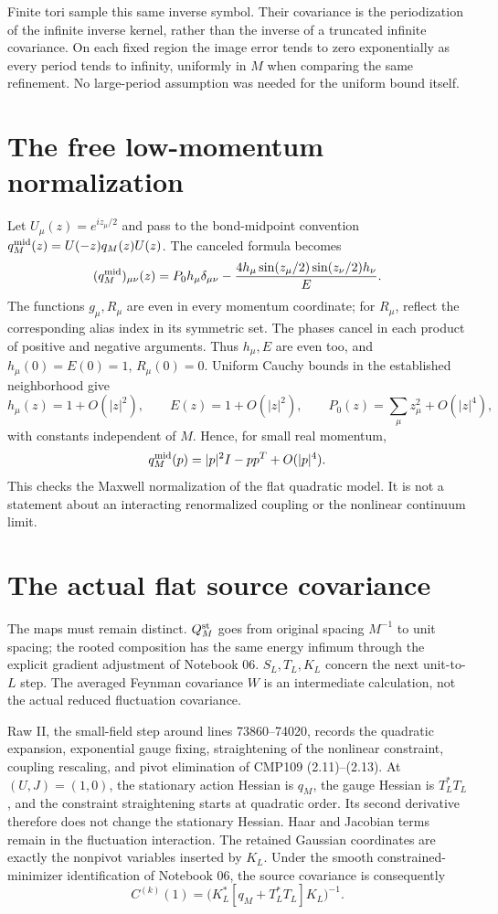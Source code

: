 \documentclass[11pt]{article}
\theoremstyle{remark}
\begin{document}
Finite tori sample this same inverse symbol. Their covariance is the
periodization of the infinite inverse kernel, rather than the inverse
of a truncated infinite covariance. On each fixed region the image
error tends to zero exponentially as every period tends to infinity,
uniformly in $M$ when comparing the same refinement. No large-period
assumption was needed for the uniform bound itself.

\section{The free low-momentum normalization}

Let $U_\mu(z)=e^{iz_\mu/2}$ and pass to the bond-midpoint convention
$q_M^{\rm mid}(z)=U(-z)q_M(z)U(z)$. The canceled formula becomes
\[
 (q_M^{\rm mid})_{\mu\nu}(z)
 =P_0h_\mu\delta_{\mu\nu}
  -\frac{4h_\mu\sin(z_\mu/2)\sin(z_\nu/2)h_\nu}{E}.
\]
The functions $g_\mu,R_\mu$ are even in every momentum coordinate;
for $R_\mu$, reflect the corresponding alias index in its symmetric
set. The phases cancel in each product of positive and negative
arguments. Thus $h_\mu,E$ are even too, and
$h_\mu(0)=E(0)=1$, $R_\mu(0)=0$.
Uniform Cauchy bounds in the established neighborhood give
\[
 h_\mu(z)=1+O(|z|^2),\qquad E(z)=1+O(|z|^2),\qquad
 P_0(z)=\sum_\mu z_\mu^2+O(|z|^4),
\]
with constants independent of $M$. Hence, for small real momentum,
\[
 q_M^{\rm mid}(p)=|p|^2I-pp^T+O(|p|^4).
\]
This checks the Maxwell normalization of the flat quadratic model.
It is not a statement about an interacting renormalized coupling
or the nonlinear continuum limit.

\section{The actual flat source covariance}\label{sec:source}

The maps must remain distinct. $Q_M^{\rm st}$ goes from original
spacing $M^{-1}$ to unit spacing; the rooted composition has the
same energy infimum through the explicit gradient adjustment of
Notebook 06. $S_L,T_L,K_L$ concern the next unit-to-$L$ step.
The averaged Feynman covariance $W$ is an intermediate calculation,
not the actual reduced fluctuation covariance.

Raw II, the small-field step around lines 73860--74020, records the
quadratic expansion, exponential gauge fixing, straightening of the
nonlinear constraint, coupling rescaling, and pivot elimination of
CMP109 (2.11)--(2.13). At $(U,J)=(1,0)$, the stationary action
Hessian is $q_M$, the gauge Hessian is $T_L^*T_L$, and the constraint
straightening starts at quadratic order. Its second derivative
therefore does not change the stationary Hessian. Haar and Jacobian
terms remain in the fluctuation interaction. The retained Gaussian
coordinates are exactly the nonpivot variables inserted by $K_L$.
Under the smooth constrained-minimizer identification of Notebook 06,
the source covariance is consequently
\[
 C^{(k)}(1)=\bigl(K_L^*[q_M+T_L^*T_L]K_L\bigr)^{-1}.
\]
\end{document}
